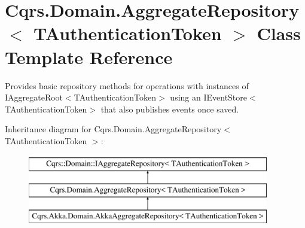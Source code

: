 \hypertarget{classCqrs_1_1Domain_1_1AggregateRepository}{}\section{Cqrs.\+Domain.\+Aggregate\+Repository$<$ T\+Authentication\+Token $>$ Class Template Reference}
\label{classCqrs_1_1Domain_1_1AggregateRepository}


Provides basic repository methods for operations with instances of I\+Aggregate\+Root$<$\+T\+Authentication\+Token$>$ using an I\+Event\+Store$<$\+T\+Authentication\+Token$>$ that also publishes events once saved.  


Inheritance diagram for Cqrs.\+Domain.\+Aggregate\+Repository$<$ T\+Authentication\+Token $>$\+:\begin{figure}[H]
\begin{center}
\leavevmode
\includegraphics[height=3.000000cm]{classCqrs_1_1Domain_1_1AggregateRepository}
\end{center}
\end{figure}
